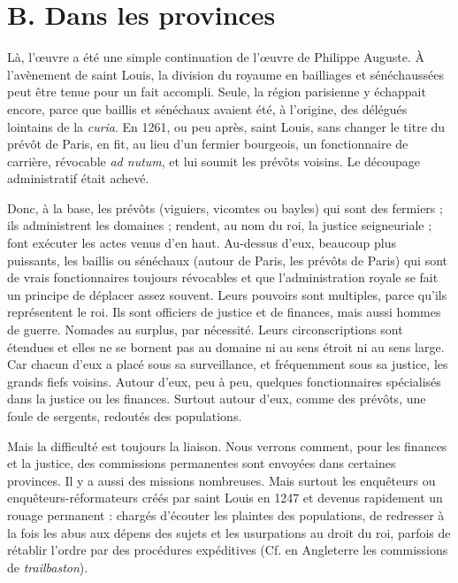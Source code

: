 \documentclass[french,twoside]{book} %
\begin{document}
\section[B. Dans les provinces]{B. Dans les provinces}
\label{c04b}
\noindent Là, l’œuvre a été une simple continuation de l’œuvre de Philippe Auguste. À l’avènement de saint Louis, la division du royaume en bailliages et sénéchaussées peut être tenue pour un fait accompli. Seule, la région parisienne y échappait encore, parce que baillis et sénéchaux avaient été, à l’origine, des délégués lointains de la {\itshape curia}. En 1261, ou peu après, saint Louis, sans changer le titre du prévôt de Paris, en fit, au lieu d’un fermier bourgeois, un fonctionnaire de carrière, révocable {\itshape ad nutum}, et lui soumit les prévôts voisins. Le découpage administratif était achevé.\par
Donc, à la base, les prévôts (viguiers, vicomtes ou bayles) qui sont des fermiers ; ils administrent les domaines ; rendent, au nom du roi, la justice seigneuriale ; font exécuter les actes venus d’en  
\label{p40} haut. Au-dessus d’eux, beaucoup plus puissants, les baillis ou sénéchaux (autour de Paris, les prévôts de Paris) qui sont de vrais fonctionnaires toujours révocables et que l’administration royale se fait un principe de déplacer assez souvent. Leurs pouvoirs sont multiples, parce qu’ils représentent le roi. Ils sont officiers de justice et de finances, mais aussi hommes de guerre. Nomades au surplus, par nécessité. Leurs circonscriptions sont étendues et elles ne se bornent pas au domaine ni au sens étroit ni au sens large. Car chacun d’eux a placé sous sa surveillance, et fréquemment sous sa justice, les grands fiefs voisins. Autour d’eux, peu à peu, quelques fonctionnaires spécialisés dans la justice ou les finances. Surtout autour d’eux, comme des prévôts, une foule de sergents, redoutés des populations.\par
Mais la difficulté est toujours la liaison. Nous verrons comment, pour les finances et la justice, des commissions permanentes sont envoyées dans certaines provinces. Il y a aussi des missions nombreuses. Mais surtout les enquêteurs ou enquêteurs-réformateurs créés par saint Louis en 1247 et devenus rapidement un rouage permanent : chargés d’écouter les plaintes des populations, de redresser à la fois les abus aux dépens des sujets et les usurpations au droit du roi, parfois de rétablir l’ordre par des procédures expéditives (Cf. en Angleterre les commissions de \emph{trailbaston}).
\end{document}

